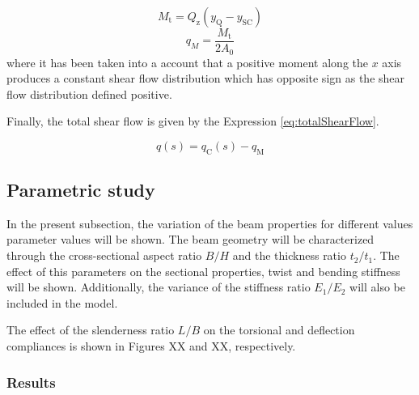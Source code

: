 



\begin{equation}\label{eq:momentDueToQz}
  M_\mathrm{t} = Q_\mathrm{z} (y_{\mathrm{Q}} - y_\mathrm{SC})
\end{equation}
%
\begin{equation}\label{eq:constantShearFlow}
  q_M = \frac{M_\mathrm{t}}{2 A_0}
\end{equation}
%
where it has been taken into a account that a positive moment along the $x$ axis produces a constant shear flow distribution which has opposite sign as the shear flow distribution defined positive.

Finally, the total shear flow is given by the Expression \ref{eq:totalShearFlow}.

\begin{equation}\label{eq:totalShearFlow}
  q(s) = q_\mathrm{C}(s) - q_\mathrm{M}
\end{equation}

\subsection{Parametric study} \label{subsec:parametricStudy} %

In the present subsection, the variation of the beam properties for different values parameter values will be shown. The beam geometry will be characterized through the cross-sectional aspect ratio $B/H$ and the thickness ratio $t_2/t_1$. The effect of this parameters on the sectional properties, twist and bending stiffness will be shown. Additionally, the variance of the stiffness ratio $E_1/E_2$ will also be included in the model.

The effect of the slenderness ratio $L/B$ on the torsional and deflection compliances is shown in Figures XX and XX, respectively.

\subsubsection{Results} \label{subsubsec:results_parametricStudy}

